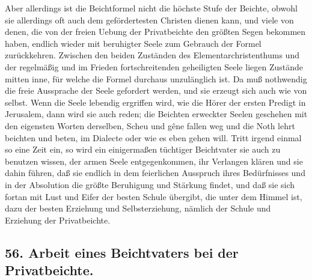 Aber allerdings ist die Beichtformel nicht die höchste Stufe der Beichte, obwohl sie allerdings oft auch dem gefördertesten Christen dienen kann, und viele von denen, die von der freien Uebung der Privatbeichte den größten Segen bekommen haben, endlich wieder mit beruhigter Seele zum Gebrauch der Formel zurückkehren. Zwischen den beiden Zuständen des Elementarchristenthums und der regelmäßig und im Frieden fortschreitenden geheiligten Seele liegen Zustände mitten inne, für welche die Formel durchaus unzulänglich ist. Da muß nothwendig die freie Aussprache der Seele gefordert werden, und sie erzeugt sich auch wie von selbst. Wenn die Seele lebendig ergriffen wird, wie die Hörer der ersten Predigt in Jerusalem, dann wird sie auch reden; die Beichten erweckter Seelen geschehen mit den eigensten Worten derselben, Scheu und gêne fallen weg und die Noth lehrt beichten und beten, im Dialecte oder wie es eben gehen will. Tritt irgend einmal so eine Zeit ein, so wird ein einigermaßen tüchtiger Beichtvater sie auch zu benutzen wissen, der armen Seele entgegenkommen, ihr Verlangen klären und sie dahin führen, daß sie endlich in dem feierlichen Ausspruch ihres Bedürfnisses und in der Absolution die größte Beruhigung und Stärkung findet, und daß sie sich fortan mit Lust und
Eifer der besten Schule übergibt, die unter dem Himmel ist, dazu der besten Erziehung und Selbsterziehung, nämlich der Schule und Erziehung der Privatbeichte.

\subsection*{56. Arbeit eines Beichtvaters bei der Privatbeichte.}

